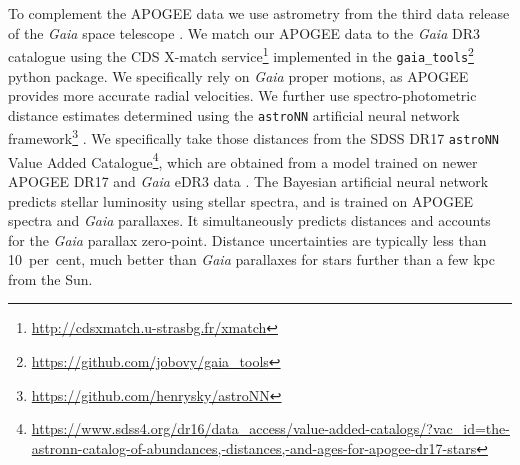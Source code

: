 To complement the APOGEE data we use astrometry from the third data release \parencite[DR3;][]{gaiadr3} of the \textit{Gaia} space telescope \parencite{gaia}. We match our APOGEE data to the \textit{Gaia} DR3 catalogue using the CDS X-match service\footnote{\url{http://cdsxmatch.u-strasbg.fr/xmatch}} implemented in the \texttt{gaia\_tools}\footnote{\url{https://github.com/jobovy/gaia_tools}} python package. We specifically rely on \textit{Gaia} proper motions, as APOGEE provides more accurate radial velocities. We further use spectro-photometric distance estimates determined using the \texttt{astroNN} artificial neural network framework\footnote{\url{https://github.com/henrysky/astroNN}} \parencite{leung19a,leung19b}. We specifically take those distances from the SDSS DR17 \texttt{astroNN} Value Added Catalogue\footnote{\url{https://www.sdss4.org/dr16/data_access/value-added-catalogs/?vac_id=the-astronn-catalog-of-abundances,-distances,-and-ages-for-apogee-dr17-stars}}, which are obtained from a model trained on newer APOGEE DR17 and \textit{Gaia} eDR3 data \parencite[see ][]{sdssdr17}. The Bayesian artificial neural network predicts stellar luminosity using stellar spectra, and is trained on APOGEE spectra and \textit{Gaia} parallaxes. It simultaneously predicts distances and accounts for the \textit{Gaia} parallax zero-point. Distance uncertainties are typically less than 10~per~cent, much better than \textit{Gaia} parallaxes for stars further than a few kpc from the Sun.

